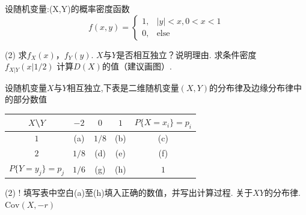 \documentclass[
    newtxsf,
    twoside,openany,
]{litesolution}
\begin{document}
\begin{problem}[本题15分]
    设随机变量:(X,Y)的概率密度函数
    \[f(x,y)=
    \begin{cases}
        1, & |y|<x,0<x<1\\
        0, & \text{else}
    \end{cases}\]
    \begin{tasks}[label=\arabic*.](2)
        \task 求$f_X(x)$，$f_Y(y)$.
        \task $X$与$Y$是否相互独立？说明理由.
        \task 求条件密度 $f_{X|Y}(x|1/2)$
        \task 计算$D(X)$的值（建议画图）.
    \end{tasks}
\end{problem}
\begin{solution}

\end{solution}

\begin{problem}[本题15分]
    设随机变量$X$与$Y$相互独立,下表是二维随机变量$(X,Y)$的分布律及边缘分布律中的部分数值
    \begin{table}[htbp]
        \centering
        \begin{tabular}{ccccc}
            \toprule
            $X$\textbackslash$Y$ & $-2$ & $0$ & $1$ & $P\{X=x_i\}=p_i$\\
            \midrule
            $1$ & (a) & $1/8$ & (b) & (c) \\
            $2$ & $1/8$ & (d) & (e) & (f) \\
            $P\{Y=y_j\}=p_j$ & $1/6$ & (g) & (h) & $1$\\
            \bottomrule
        \end{tabular}
    \end{table}
    \begin{tasks}[label=\arabic*.](2)
        \task! 填写表中空白(a)至(h)填入正确的数值，并写出计算过程.
        \task 关于$XY$的分布律.
        \task $\text{Cov}(X,-r)$
    \end{tasks}
\end{problem}
\begin{solution}

\end{solution}
\end{document}
